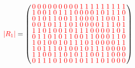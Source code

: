 \documentclass{beamer}
\newcommand{\rred}[1]{\textcolor{red}{#1}}
\newcommand{\abs}[1]{|#1|}
\begin{document}
\begin{frame}

  \[
    \rred{\abs{R_1}} = 
    \left(
      \arraycolsep=1.25pt\def\arraystretch{0.625}
      \begin{array}{cccccccccccccccccc}
       \rred{0}&\rred{0}&\rred{0}&\rred{0}&\rred{0}&\rred{0}&\rred{0}&\rred{0}&\rred{0}&\rred{1}&\rred{1}&\rred{1}&\rred{1}&\rred{1}&\rred{1}&\rred{1}&\rred{1}&\rred{1}\\
        \rred{1}&\rred{0}&\rred{0}&\rred{1}&\rred{0}&\rred{1}&\rred{1}&\rred{1}&\rred{0}&\rred{0}&\rred{0}&\rred{0}&\rred{1}&\rred{0}&\rred{1}&\rred{1}&\rred{1}&\rred{0}\\
        \rred{0}&\rred{1}&\rred{0}&\rred{1}&\rred{1}&\rred{0}&\rred{0}&\rred{1}&\rred{1}&\rred{0}&\rred{0}&\rred{0}&\rred{1}&\rred{1}&\rred{0}&\rred{0}&\rred{1}&\rred{1}\\
        \rred{0}&\rred{0}&\rred{1}&\rred{0}&\rred{1}&\rred{1}&\rred{1}&\rred{0}&\rred{1}&\rred{0}&\rred{0}&\rred{0}&\rred{0}&\rred{1}&\rred{1}&\rred{1}&\rred{0}&\rred{1}\\
        \rred{1}&\rred{1}&\rred{0}&\rred{1}&\rred{0}&\rred{0}&\rred{1}&\rred{0}&\rred{1}&\rred{1}&\rred{1}&\rred{0}&\rred{0}&\rred{0}&\rred{0}&\rred{1}&\rred{0}&\rred{1}\\
        \rred{0}&\rred{1}&\rred{1}&\rred{0}&\rred{1}&\rred{0}&\rred{1}&\rred{1}&\rred{0}&\rred{0}&\rred{1}&\rred{1}&\rred{0}&\rred{0}&\rred{0}&\rred{1}&\rred{1}&\rred{0}\\
        \rred{1}&\rred{0}&\rred{1}&\rred{0}&\rred{0}&\rred{1}&\rred{0}&\rred{1}&\rred{1}&\rred{1}&\rred{0}&\rred{1}&\rred{0}&\rred{0}&\rred{0}&\rred{0}&\rred{1}&\rred{1}\\
        \rred{1}&\rred{0}&\rred{1}&\rred{1}&\rred{1}&\rred{0}&\rred{1}&\rred{0}&\rred{0}&\rred{1}&\rred{0}&\rred{1}&\rred{1}&\rred{1}&\rred{0}&\rred{0}&\rred{0}&\rred{0}\\
        \rred{1}&\rred{1}&\rred{0}&\rred{0}&\rred{1}&\rred{1}&\rred{0}&\rred{1}&\rred{0}&\rred{1}&\rred{1}&\rred{0}&\rred{0}&\rred{1}&\rred{1}&\rred{0}&\rred{0}&\rred{0}\\
        \rred{0}&\rred{1}&\rred{1}&\rred{1}&\rred{0}&\rred{1}&\rred{0}&\rred{0}&\rred{1}&\rred{0}&\rred{1}&\rred{1}&\rred{1}&\rred{0}&\rred{1}&\rred{0}&\rred{0}&\rred{0}\\

      \end{array}
    \right)
  \]
  
\end{frame}
\end{document}
